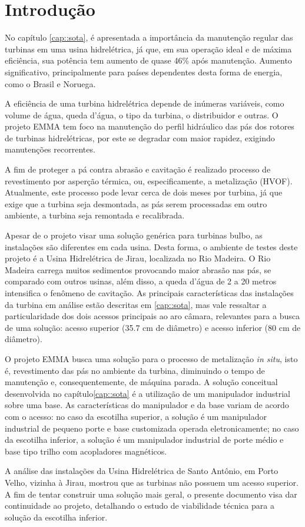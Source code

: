 \section{Introdução}\label{sec::introducao}

No capítulo \ref{cap::sota}, é apresentada a importância da manutenção regular
das turbinas em uma usina hidrelétrica, já que, em sua operação ideal e de máxima eficiência,
sua potência tem aumento de quase 46\% após manutenção. Aumento significativo,
principalmente para países dependentes desta forma de energia, como o Brasil e
Noruega.

A eficiência de uma turbina hidrelétrica depende de inúmeras variáveis, como
volume de água, queda d'água, o tipo da turbina, o distribuidor e outras. O
projeto EMMA tem foco na manutenção do perfil hidráulico das pás dos rotores de
turbinas hidrelétricas, por este se degradar com maior rapidez, exigindo
manutenções recorrentes. 

A fim de proteger a pá contra abrasão e cavitação é realizado processo de
revestimento por asperção térmica, ou, especificamente, a metalização (HVOF).
Atualmente, este processo pode levar cerca de dois meses por turbina,
já que exige que a turbina seja desmontada, as pás serem processadas em
outro ambiente, a turbina seja remontada e recalibrada.

Apesar de o projeto visar uma solução genérica para turbinas bulbo, as
instalações são diferentes em cada usina. Desta forma, o ambiente de testes
deste projeto é a Usina Hidrelétrica de Jirau, localizada no Rio Madeira. O Rio
Madeira carrega muitos sedimentos provocando maior abrasão nas pás, se comparado
com outros usinas, além disso, a queda d'água de 2 a 20 metros intensifica o
fenômeno de cavitação. As principais características das instalações da turbina
em análise estão descritas em \ref{cap::sota}, mas vale ressaltar a
particularidade dos dois acessos principais ao aro câmara, relevantes para a busca de uma
solução: acesso superior (35.7 cm de diâmetro) e acesso inferior (80 cm de
diâmetro).

O projeto EMMA busca uma solução para o processo de metalização \textit{in
situ}, isto é, revestimento das pás no ambiente da turbina, diminuindo o tempo
de manutenção e, consequentemente, de máquina parada.  A solução conceitual
desenvolvida no capítulo\ref{cap::sota} é a utilização de um manipulador
industrial sobre uma base. As características do manipulador e da base variam de acordo com o
acesso: no caso da escotilha superior, a solução é um manipulador industrial de
pequeno porte e base customizada operada eletronicamente; no caso da escotilha
inferior, a solução é um manipulador industrial de porte médio e base tipo
trilho com acopladores magnéticos.

A análise das instalações da Usina Hidrelétrica de Santo Antônio, em Porto
Velho, vizinha à Jirau, mostrou que as turbinas não possuem um acesso superior.
A fim de tentar construir uma solução mais geral, o presente documento visa dar
continuidade ao projeto, detalhando o estudo de viabilidade técnica para a
solução da escotilha inferior.

